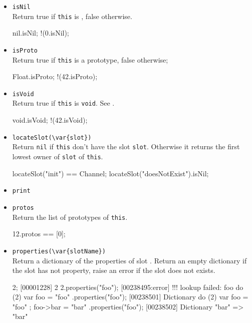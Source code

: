 \begin{itemize}
\item \lstinline|isNil|\\
  Return true if \lstinline|this| is , false otherwise.

\begin{urbiassert}[firstnumber=last]
nil.isNil;
!(0.isNil);
\end{urbiassert}

\item \lstinline|isProto|\\
  Return true if \lstinline|this| is a prototype, false otherwise;

\begin{urbiassert}[firstnumber=last]
Float.isProto;
!(42.isProto);
\end{urbiassert}

\item \lstinline|isVoid|\\
  Return true if \lstinline|this| is \lstinline|void|.  See
  .
\begin{urbiassert}[firstnumber=last]
void.isVoid;
!(42.isVoid);
\end{urbiassert}

\item \lstinline|locateSlot(\var{slot})|\\
  Return \lstinline|nil| if \lstinline|this| don't have the slot
  \lstinline|slot|. Otherwise it returns the first lowest owner of
  \lstinline|slot| of \lstinline|this|.

\begin{urbiassert}[firstnumber=last]
locateSlot("init") == Channel;
locateSlot("doesNotExist").isNil;
\end{urbiassert}

\item \lstinline|print|\\

\item \lstinline|protos|\\
  Return the list of prototypes of \lstinline|this|.
\begin{urbiassert}[firstnumber=last]
12.protos == [0];
\end{urbiassert}

\item \lstinline|properties(\var{slotName})|\\
  Return a dictionary of the properties of slot .
  Return an empty dictionary if the slot has not property, raise an
  error if the slot does not exists.
\begin{urbiscript}[firstnumber=last]
2;
[00001228] 2
2.properties("foo");
[00238495:error] !!! lookup failed: foo
do (2) { var foo = "foo" }.properties("foo");
[00238501] Dictionary {}
do (2) { var foo = "foo" ; foo->bar = "bar" }.properties("foo");
[00238502] Dictionary {"bar" => "bar"}
\end{urbiscript}


\end{itemize}
